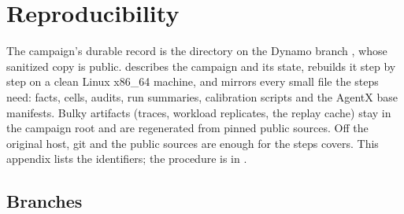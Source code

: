 %

\section{Reproducibility}
\label{app:repro}

The campaign's durable record is the directory  on the Dynamo
branch , whose sanitized copy  is
public.  describes the
campaign and its state,  rebuilds it step by step on a clean Linux x86\_64
machine, and  mirrors every small file the steps need: facts, cells, audits, run
summaries, calibration scripts and the AgentX base manifests. Bulky artifacts (traces, workload
replicates, the replay cache) stay in the campaign root and are regenerated from pinned public
sources. Off the original host, git and the public sources are enough for the steps
 covers. This appendix lists the
identifiers; the procedure is in .

\subsection{Branches}

